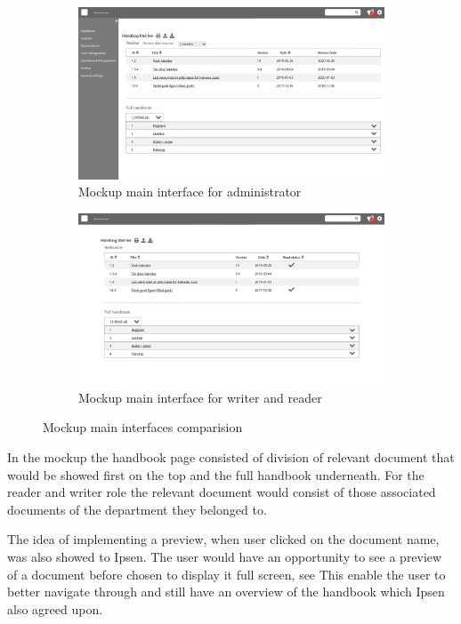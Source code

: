 \documentclass[../../master.tex]{subfiles}
\begin{document}
\begin{figure}[H]
	\centering
	\begin{subfigure}[b]{0.48\textwidth}
		\includegraphics[width=\textwidth]{billeder/ForsideAdmin.jpg}
		\caption{Mockup main interface for administrator}
	\end{subfigure}
	\quad
	\begin{subfigure}[b]{0.48\textwidth}
		\includegraphics[width=\textwidth]{billeder/ForsideWriterReader.jpg}
		\caption{Mockup main interface for writer and reader}
	\end{subfigure}
	\caption{Mockup main interfaces comparision}\label{fig:mockupSidebar}
\end{figure}

In the mockup the handbook page consisted of division of relevant document that would be showed first on the top and the full handbook underneath.
For the reader and writer role the relevant document would consist of those associated documents of the department they belonged to.

The idea of implementing a preview, when user clicked on the document name, was also showed to Ipsen.
The user would have an opportunity to see a preview of a document before chosen to display it full screen, see 
This enable the user to better navigate through and still have an overview of the handbook which Ipsen also agreed upon.
\end{document}
